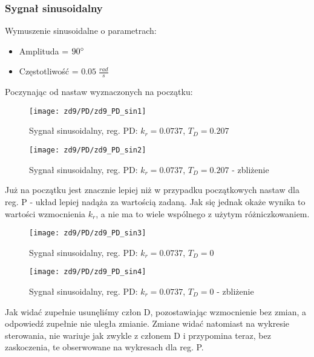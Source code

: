\documentclass[11 pt]{article}
\begin{document}
\subsubsection*{Sygnał sinusoidalny}

Wymuszenie sinusoidalne o parametrach:

\begin{itemize}
\item[]Amplituda = $90 \degree$
\item[]Częstotliwość = $0.05 \; \frac{rad}{s}$
\end{itemize}

Poczynając od nastaw wyznaczonych na początku:

\begin{figure}[h!]
	\centerline{
	\texttt{[image: zd9/PD/zd9\_PD\_sin1]}
	}
	\caption{Sygnał sinusoidalny, reg. PD: $k_r = 0.0737$, $T_D = 0.207$}
\end{figure}

\newpage

\begin{figure}[h!]
	\centerline{
	\texttt{[image: zd9/PD/zd9\_PD\_sin2]}
	}
	\caption{Sygnał sinusoidalny, reg. PD: $k_r = 0.0737$, $T_D = 0.207$ - zbliżenie}
\end{figure}

Już na początku jest znacznie lepiej niż w przypadku początkowych nastaw dla reg. P - układ lepiej nadąża za wartością zadaną. Jak się jednak okaże wynika to wartości wzmocnienia $k_r$, a nie ma to wiele wspólnego z użytym różniczkowaniem.

\begin{figure}[h!]
	\centerline{
	\texttt{[image: zd9/PD/zd9\_PD\_sin3]}
	}
	\caption{Sygnał sinusoidalny, reg. PD: $k_r = 0.0737$, $T_D = 0$}
\end{figure}

\newpage

\begin{figure}[h!]
	\centerline{
	\texttt{[image: zd9/PD/zd9\_PD\_sin4]}
	}
	\caption{Sygnał sinusoidalny, reg. PD: $k_r = 0.0737$, $T_D = 0$ - zbliżenie}
\end{figure}

Jak widać zupełnie usunęliśmy człon D, pozostawiając wzmocnienie bez zmian, a odpowiedź zupełnie nie uległa zmianie. Zmiane widać natomiast na wykresie sterowania, nie wariuje jak zwykle z członem D i przypomina teraz, bez zaskoczenia, te obserwowane na wykresach dla reg. P.
\end{document}
